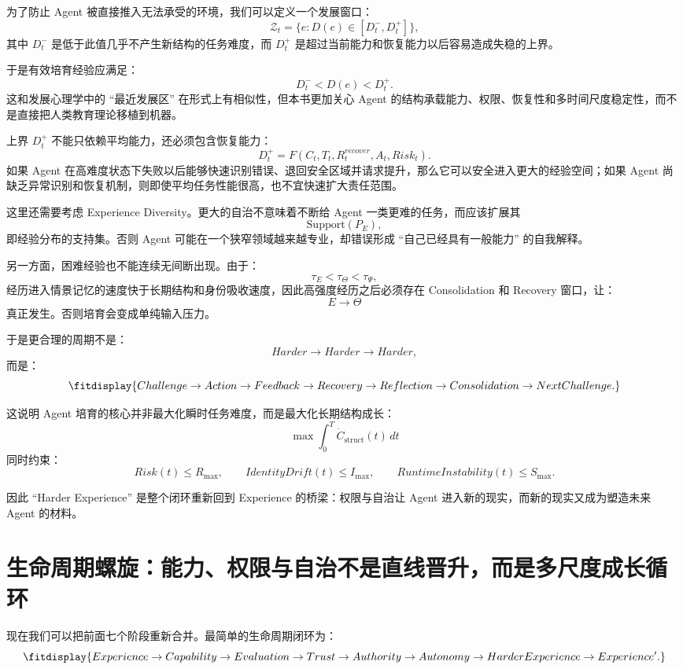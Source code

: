 为了防止 Agent 被直接推入无法承受的环境，我们可以定义一个发展窗口：
\[
\mathcal Z_t
=
\{
e:
D(e)
\in
[D^-_t,D^+_t]
\},
\]
其中 $D^-_t$ 是低于此值几乎不产生新结构的任务难度，而 $D^+_t$ 是超过当前能力和恢复能力以后容易造成失稳的上界。

于是有效培育经验应满足：
\[
D^-_t
<
D(e)
<
D^+_t.
\]
这和发展心理学中的 ``最近发展区'' 在形式上有相似性，但本书更加关心 Agent 的结构承载能力、权限、恢复性和多时间尺度稳定性，而不是直接把人类教育理论移植到机器。

上界 $D^+_t$ 不能只依赖平均能力，还必须包含恢复能力：
\[
D^+_t
=
F(
C_t,
T_t,
R^{recover}_t,
A_t,
Risk_t
).
\]
如果 Agent 在高难度状态下失败以后能够快速识别错误、退回安全区域并请求提升，那么它可以安全进入更大的经验空间；如果 Agent 尚缺乏异常识别和恢复机制，则即使平均任务性能很高，也不宜快速扩大责任范围。

这里还需要考虑 Experience Diversity。更大的自治不意味着不断给 Agent 一类更难的任务，而应该扩展其
\[
\mathrm{Support}(P_E),
\]
即经验分布的支持集。否则 Agent 可能在一个狭窄领域越来越专业，却错误形成 ``自己已经具有一般能力'' 的自我解释。

另一方面，困难经验也不能连续无间断出现。由于：
\[
\tau_E
<
\tau_\Theta
<
\tau_\Psi,
\]
经历进入情景记忆的速度快于长期结构和身份吸收速度，因此高强度经历之后必须存在 Consolidation 和 Recovery 窗口，让：
\[
E
\rightarrow
\Theta
\]
真正发生。否则培育会变成单纯输入压力。

于是更合理的周期不是：
\[
Harder
\rightarrow
Harder
\rightarrow
Harder,
\]
而是：
\[
\fitdisplay{
Challenge
\rightarrow
Action
\rightarrow
Feedback
\rightarrow
Recovery
\rightarrow
Reflection
\rightarrow
Consolidation
\rightarrow
NextChallenge.
}
\]

这说明 Agent 培育的核心并非最大化瞬时任务难度，而是最大化长期结构成长：
\[
\max
\int_0^T
\dot C_{\mathrm{struct}}(t)
\,dt
\]
同时约束：
\[
Risk(t)\leq R_{\max},
\qquad
IdentityDrift(t)\leq I_{\max},
\qquad
RuntimeInstability(t)\leq S_{\max}.
\]

因此 ``Harder Experience'' 是整个闭环重新回到 Experience 的桥梁：权限与自治让 Agent 进入新的现实，而新的现实又成为塑造未来 Agent 的材料。

\section{生命周期螺旋：能力、权限与自治不是直线晋升，而是多尺度成长循环}

现在我们可以把前面七个阶段重新合并。最简单的生命周期闭环为：
\[
\fitdisplay{
Experience
\rightarrow
Capability
\rightarrow
Evaluation
\rightarrow
Trust
\rightarrow
Authority
\rightarrow
Autonomy
\rightarrow
HarderExperience
\rightarrow
Experience'.
}
\]


